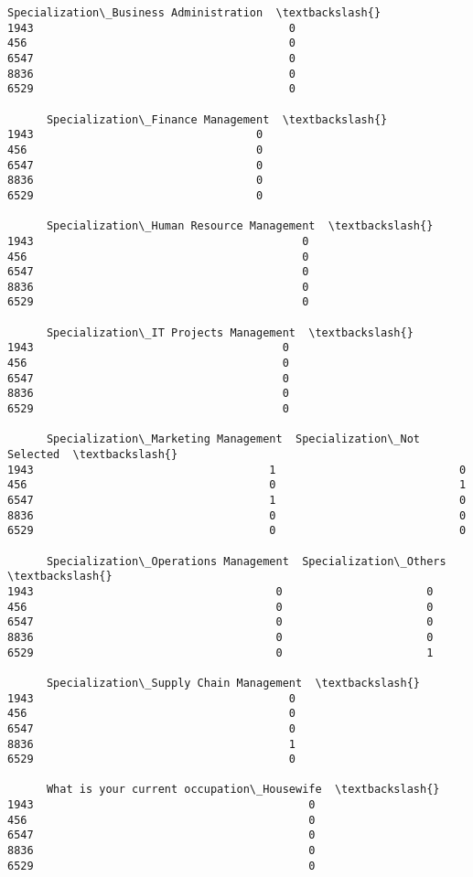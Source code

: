 \documentclass[11pt]{article}
\begin{document}
\begin{tcolorbox}[breakable, size=fbox, boxrule=.5pt, pad at break*=1mm, opacityfill=0]
\begin{Verbatim}[commandchars=\\\{\}]
      Specialization\_Business Administration  \textbackslash{}
1943                                       0
456                                        0
6547                                       0
8836                                       0
6529                                       0

      Specialization\_Finance Management  \textbackslash{}
1943                                  0
456                                   0
6547                                  0
8836                                  0
6529                                  0

      Specialization\_Human Resource Management  \textbackslash{}
1943                                         0
456                                          0
6547                                         0
8836                                         0
6529                                         0

      Specialization\_IT Projects Management  \textbackslash{}
1943                                      0
456                                       0
6547                                      0
8836                                      0
6529                                      0

      Specialization\_Marketing Management  Specialization\_Not Selected  \textbackslash{}
1943                                    1                            0
456                                     0                            1
6547                                    1                            0
8836                                    0                            0
6529                                    0                            0

      Specialization\_Operations Management  Specialization\_Others  \textbackslash{}
1943                                     0                      0
456                                      0                      0
6547                                     0                      0
8836                                     0                      0
6529                                     0                      1

      Specialization\_Supply Chain Management  \textbackslash{}
1943                                       0
456                                        0
6547                                       0
8836                                       1
6529                                       0

      What is your current occupation\_Housewife  \textbackslash{}
1943                                          0
456                                           0
6547                                          0
8836                                          0
6529                                          0


\end{Verbatim}
\end{tcolorbox}
\end{document}
